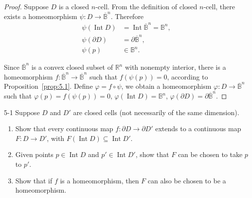 \begin{proof}
	Suppose \( D \) is a closed \( n \)-cell. From the definition of closed \( n \)-cell, there exists a homeomorphism \( \psi: D \to \overline{\mathbb{B}}^{n} \). Therefore
	\begin{align*}
		\psi(\operatorname{Int} D) & = \operatorname{Int} \overline{\mathbb{B}}^{n} = \mathbb{B}^{n}, \\
		\psi(\partial D)           & = \partial \overline{\mathbb{B}}^{n},                            \\
		\psi(p)                    & \in \mathbb{B}^{n}.
	\end{align*}

	Since \( \overline{\mathbb{B}}^{n} \) is a convex closed subset of \( \mathbb{R}^{n} \) with nonempty interior, there is a homeomorphism \( f: \overline{\mathbb{B}}^{n} \to \overline{\mathbb{B}}^{n} \) such that \( f(\psi(p)) = 0 \), according to Proposition~\ref{prop:5.1}. Define \( \varphi = f\circ \psi \), we obtain a homeomorphism \( \varphi: D \to \overline{\mathbb{B}}^{n} \) such that \( \varphi(p) = f(\psi(p)) = 0 \), \( \varphi(\operatorname{Int} D) = \mathbb{B}^{n} \), \( \varphi(\partial D) = \partial \overline{\mathbb{B}}^{n} \).
\end{proof}

\begin{problem}{5-1}\label{problem:5-1}
Suppose \( D \) and \( D' \) are closed cells (not necessarily of the same dimension).
\begin{enumerate}[label={(\alph*)}]
	\item Show that every continuous map \( f: \partial D \to \partial D' \) extends to a continuous map \( F: D \to D' \), with \( F(\operatorname{Int} D) \subseteq \operatorname{Int} D' \).
	\item Given points \( p \in \operatorname{Int} D \) and \( p' \in \operatorname{Int} D' \), show that \( F \) can be chosen to take \( p \) to \( p' \).
	\item Show that if \( f \) is a homeomorphism, then \( F \) can also be chosen to be a homeomorphism.
\end{enumerate}
\end{problem}

